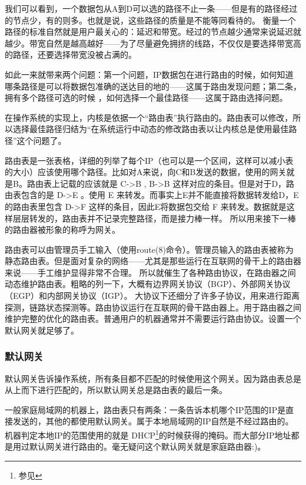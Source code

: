 我们可以看到，一个数据包从A到D可以选的路径不止一条——但是有的路径经过的节点少，有的则多。也就是说，这些路径的质量是不能等同看待的。
衡量一个路径的标准自然就是用户最关心的：延迟和带宽。经过的节点越少通常来说延迟就越少。带宽自然是越高越好——为了尽量避免拥挤的线路，不仅仅是要选择带宽高的路径，还要选择带宽没被占满的。

如此一来就带来两个问题：第一个问题，IP数据包在进行路由的时候，如何知道哪条路径是可以将数据包准确的送达目的地的——这属于路由发现问题；第二条，拥有多个路径可选的时候 ，如何选择一个最佳路径——这属于路由选择问题。

在操作系统的实现上，内核是依据一个“路由表”执行路由的。路由表可以修改，所以选择最佳路径归结为“在系统运行中动态的修改路由表以让内核总是使用最佳路径”这个问题了。

路由表是一张表格，详细的列举了每个IP（也可以是一个区间，这样可以减小表的大小）应该使用哪个路径。比如对A来说，向C和B发送的数据，使用的网关就是B。路由表上记载的应该就是 C->B , B->B 这样对应的条目。但是对于D，路由表包含的是 D->E 。使用 E 来转发。而事实上E并不能直接将数据转发给D，E 的路由表里包含 D->F 这样的条目，因此E将数据包交给 F 来转发。数据就是这样层层转发的，路由表并不记录完整路径，而是接力棒一样。
所以用来接下一棒的路由器被形象的称呼为网关。

路由表可以由管理员手工输入（使用route(8)命令）。管理员输入的路由表被称为静态路由表。但是面对复杂的网络——尤其是那些运行在互联网的骨干上的路由器来说——手工维护显得非常不合理。
所以就催生了各种路由协议，在路由器之间动态维护路由表。粗略的列一下，大概有边界网关协议（BGP）、外部网关协议（EGP）和内部网关协议（IGP）。
大协议下还细分了许多子协议，用来进行距离探测，链路状态探测等。路由协议运行在互联网的骨干路由器上。用于路由器之间维护完整的优化的路由表。普通用户的机器通常并不需要运行路由协议。设置一个默认网关就足够了。

\begin{insertnote}
\subsubsection{默认网关}

默认网关告诉操作系统，所有条目都不匹配的时候使用这个网关。因为路由表总是从上而下进行匹配的，所以默认网关总是路由表的最后一条。

一般家庭局域网的机器上，路由表只有两条：一条告诉本机哪个IP范围的IP是直接发送的，其他的都使用默认网关。属于本地局域网的IP自然是不经过路由的。机器判定本地IP的范围使用的就是
DHCP\footnote{参见}的时候获得的掩码。而大部分IP地址都是用过默认网关进行路由的。毫无疑问这个默认网关就是家庭路由器:)。

\end{insertnote}

